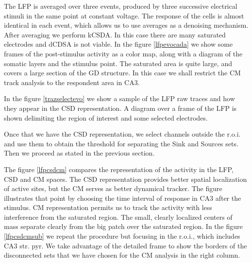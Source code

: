 \documentclass[11pt, letterpaper]{article}
\begin{document}



The LFP is averaged over three events, produced by three successive
electrical stimuli in the same point at constant voltage. The
response of the cells is almost identical in each event, which
allows us to use averages as a denoising mechanism. After averaging
we perform kCSDA. In this case there are
many saturated electrodes and dCDSA is not viable.
In the figure \ref{lfpevocada} we show some frames of the post-stimulus
activity as a color map, along
with a diagram of the somatic layers and the
stimulus point. The saturated area is quite large, and covers
a large section of the GD structure. In this case we shall
restrict the CM track analysis to the respondent area in CA3.

In the figure \ref{trazselectevo} we show a sample of the LFP
raw traces and how they appear in the CSD representation. A diagram
over a frame of the LFP is shown delimiting the region of interest and
some selected electrodes. 

Once that we have the CSD representation, we select channels outside
the r.o.i. and use them to obtain the threshold for separating
the Sink and Sources sets. Then we proceed as stated in the previous section.

The figure \ref{lfpcsdcm}  compares the representation of the activity in
the LFP, CSD and CM spaces. The CSD
representation provides better spatial localization of active sites, but the
CM serves as better dynamical tracker. The figure illustrates
that point by choosing the time interval of response in CA3 after the stimulus.
CM representation permits us to track the activity with less
interference from the saturated region. The small, clearly localized centers of
mass separate clearly from the big patch over the saturated region.
In the figure \ref{lfpcsdcmsub} we repeat the procedure but focusing in
the r.o.i., which includes CA3 str. pyr. We take advantage of the
detailed frame to show the borders of the disconnected sets that
we have chosen for the CM analysis in the right column.
\end{document}
